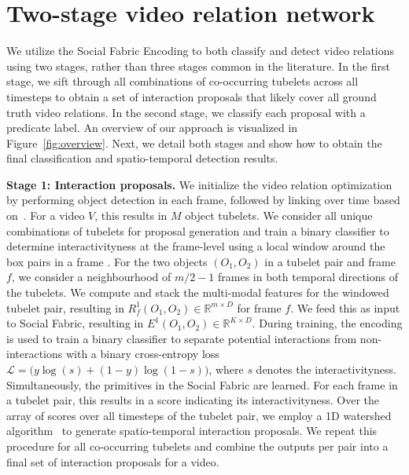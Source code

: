 \documentclass[10pt,twocolumn,letterpaper]{article}
\begin{document}
\section{Two-stage video relation network}
We utilize the Social Fabric Encoding to both classify and detect video relations using two stages, rather than three stages common in the literature. In the first stage, we sift through all combinations of co-occurring tubelets across all timesteps to obtain a set of interaction proposals that likely cover all ground truth video relations. In the second stage, we classify each proposal with a predicate label. An overview of our approach is visualized in Figure~\ref{fig:overview}. Next, we detail both stages and show how to obtain the final classification and spatio-temporal detection results.

\textbf{Stage 1: Interaction proposals.}
We initialize the video relation optimization by performing object detection in each frame, followed by linking over time based on~\cite{2017ICIP-DeepSort}. For a video $V$, this results in $M$ object tubelets. We consider all unique combinations of tubelets for proposal generation and train a binary classifier to determine interactivityness at the frame-level using a local window around the box pairs in a frame \cite{chen2020interactivity}.
For the two objects $(O_1,O_2)$ in a tubelet pair and frame $f$, we consider a neighbourhood of $m/2-1$ frames in both temporal directions of the tubelets. We compute and stack the multi-modal features for the windowed tubelet pair, resulting in $R^1_f(O_1,O_2) \in \mathbb{R}^{m \times D}$ for frame $f$. We feed this as input to Social Fabric, resulting in $E^1(O_1,O_2) \in \mathbb{R}^{K \times D}$. During training, the encoding is used to train a binary classifier to separate potential interactions from non-interactions with a binary cross-entropy loss $\mathcal{L} {=} \big(y \log(s) + (1-y) \log(1-s) \big)$, where $s$ denotes the interactivityness.
 Simultaneously, the primitives in the Social Fabric are learned. For each frame in a tubelet pair, this results in a score indicating its interactivityness. Over the array of scores over all timesteps of the tubelet pair, we employ a 1D watershed algorithm~\cite{chen2020interactivity,2000-watershed} to generate spatio-temporal interaction proposals. We repeat this procedure for all co-occurring tubelets and combine the outputs per pair into a final set of interaction proposals for a video.
\end{document}
